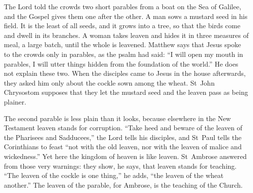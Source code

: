 \raggedcolumns

The Lord told the crowds two short parables from a boat on the Sea of Galilee,
and the Gospel gives them one after the other. A man sows a mustard seed in
his field. It is the least of all seeds, and it grows into a tree, so that the
birds come and dwell in its branches. A woman takes leaven and hides it in
three measures of meal, a large batch, until the whole is leavened. Matthew
says that Jesus spoke to the crowds only in parables, as the psalm had said:
``I will open my mouth in parables, I will utter things hidden from the
foundation of the world.'' He does not explain these two. When the disciples
came to Jesus in the house afterwards, they asked him only about the cockle
sown among the wheat. St~John Chrysostom supposes that they let the mustard
seed and the leaven pass as being plainer.

The second parable is less plain than it looks, because elsewhere in the New
Testament leaven stands for corruption. ``Take heed and beware of the leaven
of the Pharisees and Sadducees,'' the Lord tells his disciples, and St~Paul
tells the Corinthians to feast ``not with the old leaven, nor with the leaven
of malice and wickedness.'' Yet here the kingdom of heaven is like leaven.
St~Ambrose answered from those very warnings: they show, he says, that
leaven stands for teaching. ``The leaven of the cockle is one thing,'' he
adds, ``the leaven of the wheat another.'' The leaven of the parable, for
Ambrose, is the teaching of the Church.

